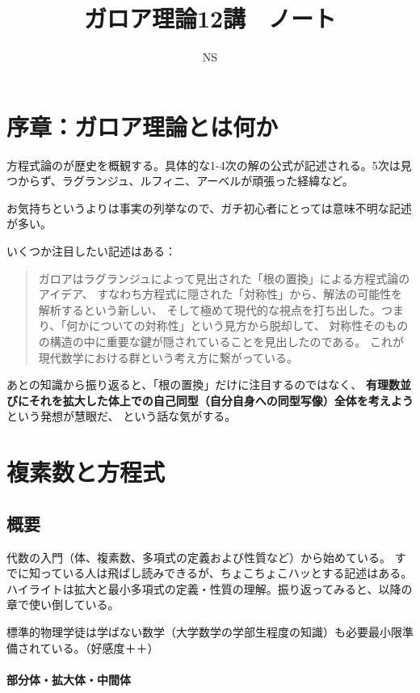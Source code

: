 \documentclass[uplatex]{jsarticle}
\title{ガロア理論12講　ノート}
\author{NS}
\begin{document}
\maketitle

\section*{序章：ガロア理論とは何か}

方程式論のが歴史を概観する。具体的な1-4次の解の公式が記述される。5次は見つからず、ラグランジュ、ルフィニ、アーベルが頑張った経緯など。

お気持ちというよりは事実の列挙なので、ガチ初心者にとっては意味不明な記述が多い。

いくつか注目したい記述はある：
\begin{quotation}
    ガロアはラグランジュによって見出された「根の置換」による方程式論のアイデア、
    すなわち方程式に隠された「対称性」から、解法の可能性を解析するという新しい、
    そして極めて現代的な視点を打ち出した。つまり、「何かについての対称性」という見方から脱却して、
    対称性そのものの構造の中に重要な鍵が隠されていることを見出したのである。
    これが現代数学における群という考え方に繋がっている。
\end{quotation}

あとの知識から振り返ると、「根の置換」だけに注目するのではなく、
\textbf{有理数並びにそれを拡大した体上での自己同型（自分自身への同型写像）全体を考えよう}という発想が慧眼だ、
という話な気がする。

\section{複素数と方程式}

\subsection{概要}
代数の入門（体、複素数、多項式の定義および性質など）から始めている。
すでに知っている人は飛ばし読みできるが、ちょこちょこハッとする記述はある。
ハイライトは拡大と最小多項式の定義・性質の理解。振り返ってみると、以降の章で使い倒している。

標準的物理学徒は学ばない数学（大学数学の学部生程度の知識）も必要最小限準備されている。（好感度＋＋）

\paragraph*{部分体・拡大体・中間体}
\end{document}
